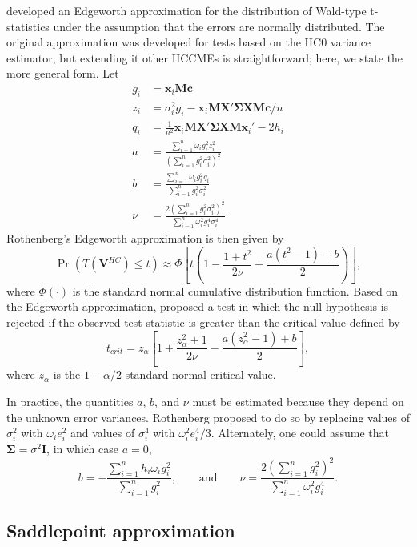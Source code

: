 \documentclass[12pt]{article}\usepackage[]{graphicx}\usepackage[]{color}
\newcommand{\bm}{\mathbf}
\newcommand{\bs}{\boldsymbol}
\begin{document}
\citet{Rothenberg1988approximate} developed an Edgeworth approximation for the distribution of Wald-type t-statistics under the assumption that the errors are normally distributed. The original approximation was developed for tests based on the HC0 variance estimator, but extending it other HCCMEs is straightforward; here, we state the more general form. 
Let
\begin{align*}
g_i &= \bm{x}_i\bm{M}\bm{c} \\
z_i &= \sigma_i^2 g_i - \bm{x}_i \bm{M}\bm{X}'\bs\Sigma \bm{X} \bm{M}\bm{c} / n \\ 
q_i &= \frac{1}{n^2} \bm{x}_i\bm{M}\bm{X}'\bs\Sigma \bm{X}\bm{M}\bm{x}_i'  - 2 h_i \\
a &= \frac{\sum_{i=1}^n \omega_i g_i^2 z_i^2}{\left(\sum_{i=1}^n g_i^2 \sigma_i^2\right)^2} \\
b &= \frac{\sum_{i=1}^n \omega_i g_i^2  q_i}{\sum_{i=1}^n g_i^2 \sigma_i^2} \\
\nu &= \frac{2\left(\sum_{i=1}^n g_i^2 \sigma_i^2\right)^2}{\sum_{i=1}^n \omega_i^2 g_i^4 \sigma_i^4}
\end{align*}
Rothenberg's Edgeworth approximation is then given by 
\[
\Pr\left(T(\bm{V}^{HC}) \leq t \right) \approx \Phi\left[t \left(1 - \frac{1 + t^2}{2\nu} + \frac{a\left(t^2 - 1\right) + b}{2}\right)\right], 
\]
where $\Phi(\cdot)$ is the standard normal cumulative distribution function.
Based on the Edgeworth approximation, \citet{Rothenberg1988approximate} proposed a test in which the null hypothesis is rejected if the observed test statistic is greater than the critical value defined by 
\begin{equation}
\label{eq:edge_Roth}
t_{crit} = z_{\alpha}\left[1 + \frac{z_{\alpha}^2 + 1}{2 \nu} - \frac{a\left(z_{\alpha}^2 - 1\right) + b}{2}\right],
\end{equation}
where $z_\alpha$ is the $1 - \alpha / 2$ standard normal critical value. 

In practice, the quantities $a$, $b$, and $\nu$ must be estimated because they depend on the unknown error variances. 
Rothenberg proposed to do so by replacing values of $\sigma_i^2$ with $\omega_i e_i^2$ and values of $\sigma_i^4$ with $\omega_i^2 e_i^4 / 3$. 
Alternately, one could assume that $\bs\Sigma = \sigma^2 \bm{I}$, in which case $a = 0$, 
\[
b = - \frac{\sum_{i=1}^n h_i \omega_i g_i^2}{\sum_{i=1}^n g_i^2}, \qquad \text{and} \qquad 
\nu = \frac{2\left(\sum_{i=1}^n g_i^2 \right)^2}{\sum_{i=1}^n \omega_i^2 g_i^4}.
\]

\subsection{Saddlepoint approximation}
\end{document}
